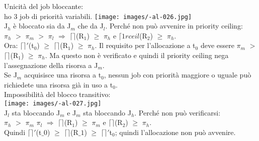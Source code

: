 \documentclass{article}
\begin{document}
Unicità del job bloccante:\\ ho 3 job di priorità variabili.
\texttt{[image: images/-al-026.jpg]}\\
J$_{h}$ è bloccato sia da J$_{m}$ che da J$_{l}$. Perché non può avvenire in priority ceiling:\\ $\pi_{h}$ $>$ $\pi_{m}$ $>$ $\pi_{l}$ $\Rightarrow$ $\lceil\rceil$(R$_{1}$) $\geq$ $\pi_{h}$ e $\lceil1rceil$(R$_{2}$) $\geq$ $\pi_{h}$.\\ Ora: $\lceil\rceil'$(t$_{0}$) $\geq$ $\lceil\rceil$(R$_{1}$) $\geq$ $\pi_{h}$. Il requisito per l'allocazione a t$_{0}$ deve essere $\pi_{m}$ $>$ $\lceil\rceil$(R$_{1}$) $\geq$ $\pi_{h}$. Ma questo non è verificato e quindi il priority ceiling nega l'assegnazione della risorsa a J$_{m}$.\\ Se J$_{m}$ acquisisce una risorsa a t$_{0}$, nessun job con priorità maggiore o uguale può richiedete una risorsa già in uso a t$_{0}$.\\ Impossibilità del blocco transitivo:\\
\texttt{[image: images/-al-027.jpg]}\\
J$_{l}$ sta bloccando J$_{m}$ e J$_{m}$ sta bloccando J$_{h}$. Perché non può verificarsi:\\ $\pi_{h}$ $>$ $\pi_{m}$ $\pi_{l}$ $\Rightarrow$ $\lceil\rceil$(R$_{1}$) $\geq$ $\pi_{m}$ e $\lceil\rceil$(R$_{2}$) $\geq$ $\pi_{h}$.\\ Quindi $\lceil\rceil'$(t$\_{0}$) $\geq$ $\lceil\rceil$(R$\_{1}$) $\geq$ $\lceil\rceil'$t$_{0}$; quindi l'allocazione non può avvenire.\\
\end{document}
